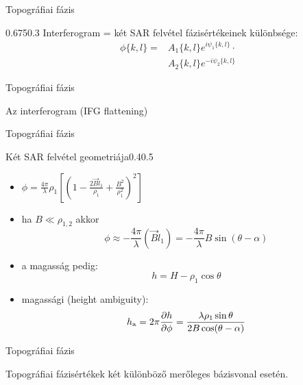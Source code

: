 \def\ft{Topográfiai fázis}

\begin{frame}{\ft}
    \begin{figp}{}{}{0.675}{0.3}
        Interferogram = két SAR felvétel fázisértékeinek különbsége:
        \begin{align*}
            \phi\{k,l\} = & A_1\{k,l\} e^{i\psi_1\{k,l\}} \cdot \\
                          & A_2\{k,l\} e^{-i\psi_2\{k,l\}}
        \end{align*}
    \end{figp}
\end{frame}


\begin{frame}{\ft}
    \begin{minic}{0.6}
        \centering
        
        Az interferogram  (IFG flattening)
    \end{minic}
\end{frame}


\begin{frame}{\ft}
    \begin{figp}{}{Két SAR felvétel geometriája}{0.4}{0.5}
        \begin{itemize}
            \item $\phi = \frac{4\pi}{\lambda}\rho_1\left[\left(1 - \frac{2 \vec{B}\hat{l}_1}{\rho_1} + \frac{B^2}{\rho_1^2}\right)^2\right]$
            \item ha $B \ll \rho_{1,2}$ akkor $$\phi \approx - \frac{4\pi}{\lambda} (\vec{B}\hat{l}_1) = - \frac{4\pi}{\lambda} B \sin(\theta - \alpha)$$
            \item a magasság pedig: $$h = H - \rho_1 \cos\theta$$
            \item magassági  (height ambiguity): $$h_{\text{a}} = 2\pi \frac{\partial h}{\partial \phi} = \frac{\lambda\rho_1\sin\theta}{2B\cos(\theta - \alpha)}$$
        \end{itemize}
    \end{figp}
\end{frame}


\begin{frame}{\ft}
    \begin{center}
    \begin{minipage}[c]{0.45\textwidth}
    \end{minipage}
    \hspace{10pt}
    \begin{minipage}[c]{0.45\textwidth}
    \end{minipage}
    \centering
    
    Topográfiai fázisértékek két különböző merőleges bázisvonal esetén.
    \end{center}
\end{frame}

